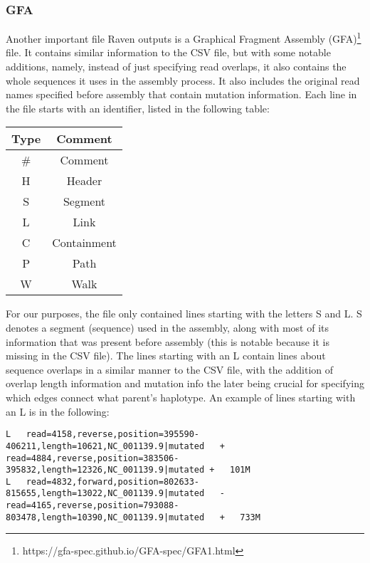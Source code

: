 \documentclass[times, utf8, diplomski, english]{fer_eng}
\begin{document}
\subsubsection{GFA}

Another important file Raven outputs is a Graphical Fragment Assembly (GFA)\footnote{https://gfa-spec.github.io/GFA-spec/GFA1.html} file. It contains similar information to the CSV file, but with some notable additions, namely, instead of just specifying read overlaps, it also contains the whole sequences it uses in the assembly process. It also includes the original read names specified before assembly that contain mutation information. Each line in the file starts with an identifier, listed in the following table:

\begin{center}
	\begin{tabular}{ |c|c| }
		\hline
		\textbf{Type} & \textbf{Comment} \\
		\hline
		\# & Comment \\
		\hline
		H & Header \\
		\hline
		S & Segment \\
		\hline
		L & Link \\
		\hline
		C & Containment \\
		\hline
		P & Path \\
		\hline
		W & Walk \\
		\hline
	\end{tabular}
\end{center}

For our purposes, the file only contained lines starting with the letters S and L. S denotes a segment (sequence) used in the assembly, along with most of its information that was present before assembly (this is notable because it is missing in the CSV file). The lines starting with an L contain lines about sequence overlaps in a similar manner to the CSV file, with the addition of overlap length information and mutation info the later being crucial for specifying which edges connect what parent's haplotype. An example of lines starting with an L is in the following:

\begin{lstlisting}
L	read=4158,reverse,position=395590-406211,length=10621,NC_001139.9|mutated	+ read=4884,reverse,position=383506-395832,length=12326,NC_001139.9|mutated	+	101M
L	read=4832,forward,position=802633-815655,length=13022,NC_001139.9|mutated	-	read=4165,reverse,position=793088-803478,length=10390,NC_001139.9|mutated	+	733M
\end{lstlisting}
\end{document}
